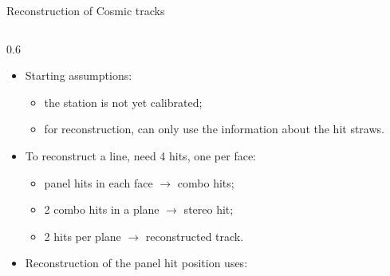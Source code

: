 \documentclass{beamer}[10pt]
\begin{document}
\begin{frame}{Reconstruction of Cosmic tracks}
  \begin{columns}
    \begin{column}{0.6 \framewidth}
      \begin{itemize}
  \item  Starting assumptions:
  \begin{itemize}
    \item the station is not yet calibrated;
    \item for reconstruction, can only use the information about the hit straws.
  \end{itemize}
  \vspace{3mm}
\item To reconstruct a line, need 4 hits, one per face:
        \begin{itemize}
          \item panel hits in each face $\rightarrow$ combo hits;
          \item 2 combo hits in a plane $\rightarrow$ stereo hit;
          \item 2 hits per plane $\rightarrow$ reconstructed track.
        \end{itemize}
        \vspace{3mm}

  \item Reconstruction of the panel hit position uses:
  \vspace{2mm}


\end{itemize}
\end{column}
\end{columns}
\end{frame}
\end{document}

